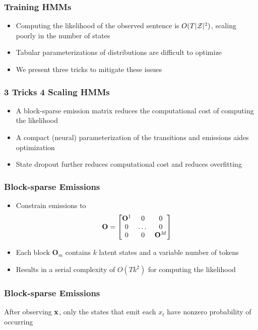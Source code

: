 \documentclass{beamer}
\begin{document}
\begin{frame}
\frametitle{Training HMMs}
\begin{itemize}
\item Computing the likelihood of the observed sentence is $O(T|\mathcal{Z}|^2)$,
    scaling poorly in the number of states
\item Tabular parameterizations of distributions are difficult to optimize
\item We present three tricks to mitigate these issues
\end{itemize}
\end{frame}

\begin{frame}
\frametitle{3 Tricks 4 Scaling HMMs}
\begin{itemize}
\item A block-sparse emission matrix reduces the computational cost of computing the likelihood
\item A compact (neural) parameterization of the transitions and emissions
    aides optimization
\item State dropout further reduces computational cost and reduces overfitting
\end{itemize}
\end{frame}

\begin{frame}
\frametitle{Block-sparse Emissions}
\begin{itemize}
\item Constrain emissions to
\[\mathbf{O} = \begin{bmatrix} \mathbf{O}^1 & 0 & 0 \\ 0 & $\dots$ & 0 \\ 0 & 0 & \mathbf{O}^M \\
\end{bmatrix}\]
\item Each block $\mathbf{O}_m$ contains $k$ latent states and a variable number of tokens
\item Results in a serial complexity of $O(Tk^2)$ for computing the likelihood
\end{itemize}
\end{frame}

\begin{frame}
\frametitle{Block-sparse Emissions}
\begin{center}
\resizebox{2in}{2in}{

}
\end{center}

After observing $\mathbf{x}$, only the states that emit each $x_t$ have nonzero probability
of occurring
\end{frame}
\end{document}
